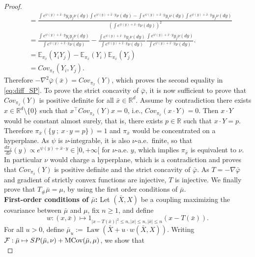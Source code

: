 \documentclass[reqno, a4paper]{amsart}
\theoremstyle{plain}
\theoremstyle{definition}
\theoremstyle{remark}
\numberwithin{equation}{section}
\numberwithin{theorem}{section}
\newcommand{\R}{\mathbb{R}}
\newcommand{\E}{\mathbb{E}}
\newcommand{\MCov}{\textnormal{MCov}}
\newcommand{\Law}{\operatorname{Law}}
\begin{document}
\begin{proof}
\begin{align*}
			&= \frac{ \int e^{\psi(y)+\bar x \cdot y} y_iy_j \nu(dy) \int e^{\psi(y)+\bar x \cdot y}\nu(dy) -  \int e^{\psi(y)+\bar x \cdot y} y_i \nu(dy) \int e^{\psi(y)+\bar x \cdot y} y_j \nu(dy)}{\left( \int e^{\psi(y)+\bar x \cdot y} \nu(dy)\right)^2}\\
			&= \frac{\int e^{\psi(y)+\bar x \cdot y} y_iy_j \nu(dy)}{\int e^{\psi(y)+\bar x \cdot y} \nu(dy)}- \frac{\int e^{\psi(y)+\bar x \cdot y} y_i \nu(dy)}{\int e^{\psi(y)+\bar x \cdot y} \nu(dy)} \frac{\int e^{\psi(y)+\bar x \cdot y} y_j \nu(dy)}{\int e^{\psi(y)+\bar x \cdot y}  \nu(dy)}.\\
			&= \E_{\pi_{\bar x}}(Y_iY_j)- \E_{\pi_{\bar x}}(Y_i)\E_{\pi_{\bar x}}(Y_j)\\
			&= Cov_{\pi_{\bar x}}(Y_i,Y_j).
		\end{align*}  
		Therefore $-\nabla^2 \bar\varphi (\bar x) = Cov_{\pi_{\bar x}}(Y)$, which proves the second equality in \eqref{eq:diff_SP}. To prove the strict concavity of $\bar\varphi$, it is now sufficient to prove that $Cov_{\pi_{\bar x}}(Y)$ is positive definite  for all $\bar x \in \R^d$. Assume by contradiction there exists $ x \in \R^d \setminus \{0\}$ such that $ x^\top Cov_{\pi_{\bar x}}(Y)  x = 0$, i.e., $Cov_{\pi_{\bar x}}(x \cdot Y) =0$. Then $x\cdot Y$ would be constant almost surely, that is, there exists $p \in \R$ such that $x \cdot Y = p$. Therefore $\pi_{\bar x}(\{y~;~x\cdot y = p\})=1$ and $\pi_{\bar x}$ would be concentrated on a hyperplane. As $\psi$ is $\nu$-integrable, it is also $\nu$-a.e.\ finite, so that $\frac{d\pi_{\bar x}}{d\nu}(y) \propto e^{\psi(y)+ \bar x \cdot y} \in ]0,+\infty[$ for $\nu$-a.e. $y$, which implies $\pi_{\bar x}$ is equivalent to $\nu$. In particular $\nu$ would charge a hyperplane, which is a contradiction and proves that $Cov_{\pi_{\bar x}}(Y)$ is positive definite and the strict concavity of $\bar\varphi$. As $T = -\nabla \bar\varphi$ and gradient of strictly convex functions are injective, $T$ is injective. We finally prove that $T_\# \bar \mu = \mu$, by using the first order conditions of $\bar{\mu}$.\\
		\textbf{First-order conditions of $\bar{\mu}$:} Let  $(\bar X, X)$ be a coupling maximizing the covariance between $\bar \mu$ and $\mu$, fix $n \geq 1$, and define $$w : (x,\bar x) \mapsto 1_{|x-T(\bar x)|^2 \leq n, |x| \leq n,|\bar x| \leq n} (x-T(\bar x)).$$ For all $u >0$, define $\bar \mu_u := \Law(\bar X + u \cdot w(\bar X,X))$.
		Writing $\mathcal F : \bar \mu \mapsto SP(\bar \mu,\nu) + \MCov(\bar \mu,\mu)$, we show that 
		\begin{equation}\label{eq:rhs_der_F}

\end{equation}
\end{proof}
\end{document}
